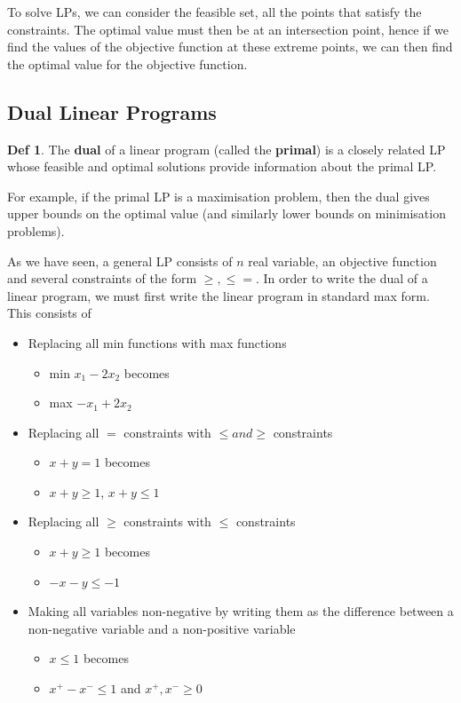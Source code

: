 \documentclass{article}
\theoremstyle{plain}
\theoremstyle{definition}
\newtheorem{defn}[dummy]{Def}
\begin{document}
    To solve LPs, we can consider the feasible set, all the points that satisfy the constraints. The optimal value must then be at an intersection point, hence if we find the values of the objective function at these extreme points, we can then find the optimal value for the objective function. 

    \subsection{Dual Linear Programs}

        \begin{defn}
            The \textbf{dual} of a linear program (called the \textbf{primal}) is a closely related LP whose feasible and optimal solutions provide information about the primal LP.
        \end{defn}
        For example, if the primal LP is a maximisation problem, then the dual gives upper bounds on the optimal value (and similarly lower bounds on minimisation problems).

        As we have seen, a general LP consists of $n$ real variable, an objective function and several constraints of the form $\geq, \leq =$. In order to write the dual of a linear program, we must first write the linear program in standard max form. This consists of
        \begin{itemize}
            \item Replacing all min functions with max functions
            \begin{itemize}
                \item min $x_1 - 2x_2 $ becomes 
                \item  max $-x_1 + 2x_2$
            \end{itemize}
            \item Replacing all $=$ constraints with $\leq and \geq$ constraints
            \begin{itemize}
                \item $x + y = 1 $ becomes 
                \item $ x + y \geq 1$, $x + y \leq 1$
            \end{itemize}
            \item Replacing all $\geq$ constraints with $\leq$ constraints
            \begin{itemize}
                \item $x + y \geq 1 $ becomes 
                \item $ -x-y \leq -1$
            \end{itemize}
            \item Making all variables non-negative by writing them as the difference between a non-negative variable and a non-positive variable
            \begin{itemize}
                \item $x \leq 1 $ becomes 
                \item $ x^+ - x^- \leq 1$ and $x^+, x^- \geq 0$
            \end{itemize}
        \end{itemize}
\end{document}
